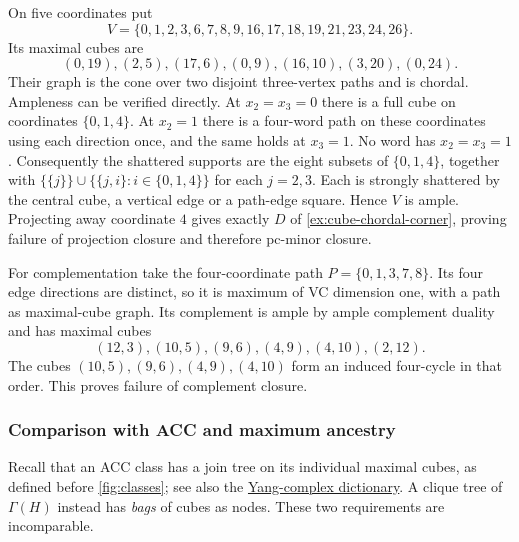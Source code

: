 \begin{example}
\label{ex:cube-chordal-projection}
On five coordinates put
\[
 V=\{0,1,2,3,6,7,8,9,16,17,18,19,21,23,24,26\}.
\]
Its maximal cubes are
\[
 (0,19),(2,5),(17,6),(0,9),(16,10),(3,20),(0,24).
\]
Their graph is the cone over two disjoint three-vertex paths and is
chordal. Ampleness can be verified directly. At $x_2=x_3=0$ there is a
full cube on coordinates $\{0,1,4\}$. At $x_2=1$ there is a four-word
path on these coordinates using each direction once, and the same holds
at $x_3=1$. No word has $x_2=x_3=1$. Consequently the shattered supports
are the eight subsets of $\{0,1,4\}$, together with
$\{\{j\}\}\cup\{\{j,i\}:i\in\{0,1,4\}\}$ for each $j=2,3$.
Each is strongly shattered by the central cube, a vertical edge or a
path-edge square. Hence $V$ is ample. Projecting away coordinate $4$
gives exactly $D$ of \cref{ex:cube-chordal-corner}, proving failure
of projection closure and therefore pc-minor closure.

For complementation take the four-coordinate path
$P=\{0,1,3,7,8\}$. Its four edge directions are distinct, so it is
maximum of VC dimension one, with a path as maximal-cube graph.
Its complement is ample by ample complement duality and has maximal cubes
\[
 (12,3),(10,5),(9,6),(4,9),(4,10),(2,12).
\]
The cubes $(10,5),(9,6),(4,9),(4,10)$ form an induced four-cycle in
that order. This proves failure of complement closure.
\end{example}

\subsubsection{Comparison with ACC and maximum ancestry}

Recall that an ACC class has a join tree on its individual maximal
cubes, as defined before \cref{fig:classes}; see also the
\href{../../../YangDim/yang_complex_dictionary.tex}{Yang-complex dictionary}.
A clique tree of $\Gamma(H)$ instead has \emph{bags} of cubes as nodes.
These two requirements are incomparable.

